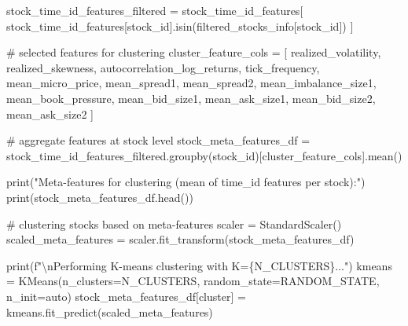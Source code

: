 \documentclass[
  letterpaper,
  DIV=11,
  numbers=noendperiod]{scrartcl}
\newenvironment{Shaded}{\begin{snugshade}}{\end{snugshade}}
\newcommand{\BuiltInTok}[1]{\textcolor[rgb]{0.00,0.23,0.31}{#1}}
\newcommand{\CharTok}[1]{\textcolor[rgb]{0.13,0.47,0.30}{#1}}
\newcommand{\CommentTok}[1]{\textcolor[rgb]{0.37,0.37,0.37}{#1}}
\newcommand{\NormalTok}[1]{\textcolor[rgb]{0.00,0.23,0.31}{#1}}
\newcommand{\OperatorTok}[1]{\textcolor[rgb]{0.37,0.37,0.37}{#1}}
\newcommand{\SpecialCharTok}[1]{\textcolor[rgb]{0.37,0.37,0.37}{#1}}
\newcommand{\SpecialStringTok}[1]{\textcolor[rgb]{0.13,0.47,0.30}{#1}}
\newcommand{\StringTok}[1]{\textcolor[rgb]{0.13,0.47,0.30}{#1}}
\begin{document}
\begin{Shaded}
\begin{Highlighting}[]
\NormalTok{stock\_time\_id\_features\_filtered }\OperatorTok{=}\NormalTok{ stock\_time\_id\_features[}
\NormalTok{    stock\_time\_id\_features[}\StringTok{\textquotesingle{}stock\_id\textquotesingle{}}\NormalTok{].isin(filtered\_stocks\_info[}\StringTok{\textquotesingle{}stock\_id\textquotesingle{}}\NormalTok{])}
\NormalTok{]}

\CommentTok{\# selected features for clustering}
\NormalTok{cluster\_feature\_cols }\OperatorTok{=}\NormalTok{ [}
    \StringTok{\textquotesingle{}realized\_volatility\textquotesingle{}}\NormalTok{, }\StringTok{\textquotesingle{}realized\_skewness\textquotesingle{}}\NormalTok{, }\StringTok{\textquotesingle{}autocorrelation\_log\_returns\textquotesingle{}}\NormalTok{, }
    \StringTok{\textquotesingle{}tick\_frequency\textquotesingle{}}\NormalTok{, }\StringTok{\textquotesingle{}mean\_micro\_price\textquotesingle{}}\NormalTok{, }\StringTok{\textquotesingle{}mean\_spread1\textquotesingle{}}\NormalTok{, }\StringTok{\textquotesingle{}mean\_spread2\textquotesingle{}}\NormalTok{, }
    \StringTok{\textquotesingle{}mean\_imbalance\_size1\textquotesingle{}}\NormalTok{, }\StringTok{\textquotesingle{}mean\_book\_pressure\textquotesingle{}}\NormalTok{,}
    \StringTok{\textquotesingle{}mean\_bid\_size1\textquotesingle{}}\NormalTok{, }\StringTok{\textquotesingle{}mean\_ask\_size1\textquotesingle{}}\NormalTok{, }\StringTok{\textquotesingle{}mean\_bid\_size2\textquotesingle{}}\NormalTok{, }\StringTok{\textquotesingle{}mean\_ask\_size2\textquotesingle{}}
\NormalTok{]}

\CommentTok{\# aggregate features at stock level}
\NormalTok{stock\_meta\_features\_df }\OperatorTok{=}\NormalTok{ stock\_time\_id\_features\_filtered.groupby(}\StringTok{\textquotesingle{}stock\_id\textquotesingle{}}\NormalTok{)[cluster\_feature\_cols].mean()}

\BuiltInTok{print}\NormalTok{(}\StringTok{"Meta{-}features for clustering (mean of time\_id features per stock):"}\NormalTok{)}
\BuiltInTok{print}\NormalTok{(stock\_meta\_features\_df.head())}

\CommentTok{\# clustering stocks based on meta{-}features}
\NormalTok{scaler }\OperatorTok{=}\NormalTok{ StandardScaler()}
\NormalTok{scaled\_meta\_features }\OperatorTok{=}\NormalTok{ scaler.fit\_transform(stock\_meta\_features\_df)}

\BuiltInTok{print}\NormalTok{(}\SpecialStringTok{f"}\CharTok{\textbackslash{}n}\SpecialStringTok{Performing K{-}means clustering with K=}\SpecialCharTok{\{}\NormalTok{N\_CLUSTERS}\SpecialCharTok{\}}\SpecialStringTok{..."}\NormalTok{)}
\NormalTok{kmeans }\OperatorTok{=}\NormalTok{ KMeans(n\_clusters}\OperatorTok{=}\NormalTok{N\_CLUSTERS, random\_state}\OperatorTok{=}\NormalTok{RANDOM\_STATE, n\_init}\OperatorTok{=}\StringTok{\textquotesingle{}auto\textquotesingle{}}\NormalTok{)}
\NormalTok{stock\_meta\_features\_df[}\StringTok{\textquotesingle{}cluster\textquotesingle{}}\NormalTok{] }\OperatorTok{=}\NormalTok{ kmeans.fit\_predict(scaled\_meta\_features)}


\end{Highlighting}
\end{Shaded}
\end{document}
